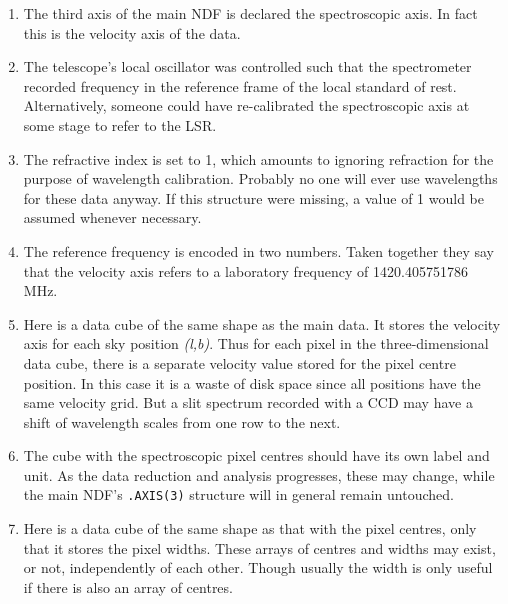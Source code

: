 \begin{enumerate}
\item The third axis of the main NDF is declared the spectroscopic axis.
   In fact this is the velocity axis of the data.

\item The telescope's local oscillator was controlled such that the
   spectrometer recorded frequency in the reference frame of the local
   standard of rest. Alternatively, someone could have re-calibrated the
   spectroscopic axis at some stage to refer to the LSR.

\item The refractive index is set to 1, which amounts to ignoring
   refraction for the purpose of wavelength calibration. Probably no one
   will ever use wavelengths for these data anyway. If this structure
   were missing, a value of 1 would be assumed whenever necessary.

\item The reference frequency is encoded in two numbers. Taken together
   they say that the velocity axis refers to a laboratory frequency of
   1420.405751786 MHz.

\item Here is a data cube of the same shape as the main data. It stores
   the velocity axis for each sky position {\it(l,b)}. Thus for each
   pixel in the three-dimensional data cube, there is a separate
   velocity value stored for the pixel centre position. In this case it
   is a waste of disk space since all positions have the same velocity
   grid. But a slit spectrum recorded with a CCD may have a shift of
   wavelength scales from one row to the next.

\item The cube with the spectroscopic pixel centres should have its own
   label and unit. As the data reduction and analysis progresses, these
   may change, while the main NDF's {\tt .AXIS(3)} structure will in
   general remain untouched.

\item Here is a data cube of the same shape as that with the pixel
   centres, only that it stores the pixel widths. These arrays of centres
   and widths may exist, or not, independently of each other.  Though
   usually the width is only useful if there is also an array of
   centres.


\end{enumerate}
